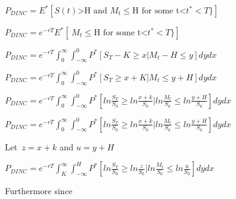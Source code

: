 \documentclass[12pt]{article}
\renewcommand{\_}{\kern-1.5pt\textunderscore\kern-1.5pt}
\begin{document}
\begin{Center}
 \( P_{DINC}=E^{\ast} \left[ S \left( t \right) \text{>H and }M_{t} \leq \text{H for some t<}t^{\ast}<T \}  \right]  \) 
\end{Center}\par

\begin{Center}
 \( P_{DINC}=e^{-rT}E^{\ast} \left[ ~M_{t} \leq \text{H for some t<}t^{\ast}<T \}  \right]  \) 
\end{Center}\par

\begin{Center}
 \( P_{DINC}=e^{-rT} \int _{0}^{\infty} \int _{-\infty}^{0}P^{\ast} \left[ S_{T}-K \geq x \vert M_{t}-H \leq y \right] dydx \) 
\end{Center}\par

\begin{Center}
 \( P_{DINC}=e^{-rT} \int _{0}^{\infty} \int _{-\infty}^{0}P^{\ast} \left[ S_{T} \geq x+K \vert M_{t} \leq y+H \right] dydx \) 
\end{Center}\par

\begin{Center}
 \( P_{DINC}=e^{-rT} \int _{0}^{\infty} \int _{-\infty}^{0}P^{\ast} \left[ ln\frac{S_{T}}{S_{0}} \geq ln\frac{x+k}{S_{0}} \vert ln\frac{M_{t}}{S_{0}} \leq ln\frac{y+H}{S_{0}} \right] dydx \) 
\end{Center}\par

\begin{Center}
 \( P_{DINC}=e^{-rT} \int _{0}^{\infty} \int _{-\infty}^{0}P^{\ast} \left[ ln\frac{S_{T}}{S_{0}} \geq ln\frac{x+k}{S_{0}} \vert ln\frac{M_{t}}{S_{0}} \leq ln\frac{y+H}{S_{0}} \right] dydx \)  
\end{Center}\par

Let\   \( z=x+k \)  and  \( u=y+H \)  \par

\begin{Center}
 \( P_{DINC}=e^{-rT} \int _{K}^{\infty} \int _{-\infty}^{H}P^{\ast} \left[ ln\frac{S_{T}}{S_{0}} \geq ln\frac{z}{S_{0}} \vert ln\frac{M_{t}}{S_{0}} \leq ln\frac{u}{S_{0}} \right] dydx \) 
\end{Center}\par

Furthermore since\par
\end{document}
